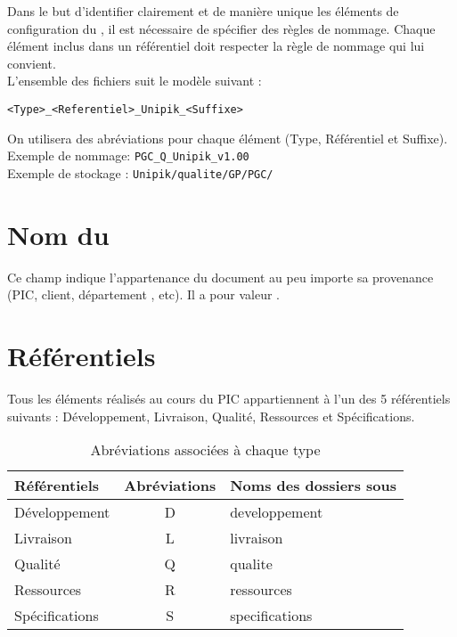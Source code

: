 
Dans le but d'identifier clairement et de manière unique les éléments de configuration du \picCourt{}, il est nécessaire de spécifier des règles de nommage. Chaque élément inclus dans un référentiel doit respecter la règle de nommage qui lui convient.\\

L'ensemble des fichiers suit le modèle suivant :
\begin{center}
  \verb+<Type>_<Referentiel>_Unipik_<Suffixe>+
\end{center}
On utilisera des abréviations pour chaque élément (Type, Référentiel et Suffixe).\\
Exemple de nommage: \verb+PGC_Q_Unipik_v1.00+\\
Exemple de stockage : \verb+Unipik/qualite/GP/PGC/+


\section{Nom du \picCourt{}}
Ce champ indique l'appartenance du document au \PICCourt{} peu importe sa provenance
 (PIC, client, département \ASI{}, etc). Il a pour valeur \textbf{\nomEquipe}.

\section{Référentiels}

Tous les éléments réalisés au cours du PIC appartiennent à l'un des 5 référentiels suivants : Développement, Livraison, Qualité, Ressources et Spécifications.
\begin{table}[H]
\centering
	\begin{tabularx}{11cm}{|X|c|X|}
	\hline
	\rowcolor[gray]{0.85} Référentiels & Abréviations & Noms des dossiers sous \git{} \\
	\hline
	Développement & D & developpement\\
	\hline
	Livraison & L & livraison\\
	\hline
	Qualité & Q & qualite\\
	\hline	
	Ressources & R & ressources\\
	\hline 
	Spécifications & S & specifications\\ 
	\hline
	\end{tabularx}
\caption{Abréviations associées à chaque type}
\label{Référentiel}
\end{table}

